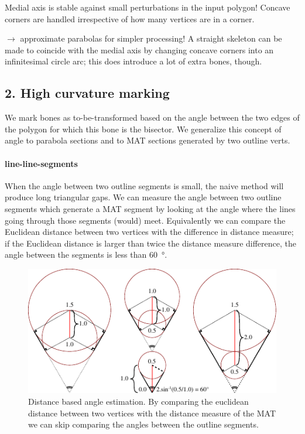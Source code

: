 Medial axis is stable against small perturbations in the input polygon!
Concave corners are handled irrespective of how many vertices are in a corner.


$\to$ approximate parabolas for simpler processing!
A straight skeleton can be made to coincide with the medial axis by changing concave corners into an infinitesimal circle arc;
this does introduce a lot of extra bones, though.






\subsection{2. High curvature marking}
\label{sec:transitioning_cutoff}
We mark bones as to-be-transformed based on the angle between the two edges of the polygon for which this bone is the bisector.
We generalize this concept of angle to parabola sections and to MAT sections generated by two outline verts.

\paragraph{line-line-segments}
When the angle between two outline segments is small, the naive method will produce long triangular gaps.
We can measure the angle between two outline segments which generate a MAT segment by looking at the angle where the lines going through those segments (would) meet.
Equivalently we can compare the Euclidean distance between two vertices with the difference in distance measure;
if the Euclidean distance is larger than twice the distance measure difference, the angle between the segments is less than {\SI{60}{\degree}}.

\begin{figure}[H]
\centering
\includegraphics[width=.9\columnwidth]{sources/method/distance_based_angles.pdf}
\caption{Distance based angle estimation. By comparing the euclidean distance between two vertices with the distance measure of the MAT we can skip comparing the angles between the outline segments.}
\label{distance_based_angles}
\end{figure}

